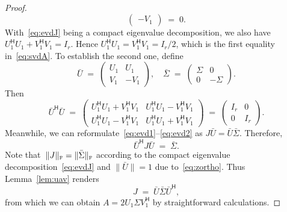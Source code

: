 \documentclass[11pt,a4paper]{article}  %
\numberwithin{equation}{section}
\theoremstyle{definition}
\newcommand{\fro}{{\scriptscriptstyle{\textnormal{F}}}}
\newcommand{\hmt}{{\scriptscriptstyle{{\mathsf{H}}}}}
\begin{document}
\begin{proof}
\begin{equation*}
\begin{pmatrix}
      -V_1
    \end{pmatrix} \;=\;0.
  \end{equation*}
  With~\eqref{eq:evdJ} being a compact eigenvalue decomposition, we also have~$U_1^\hmt U_1 + V_1^\hmt V_1 = I_r$.
  Hence $U_1^\hmt U_1 = V_1^\hmt V_1= {I_r}/{2}$,
  which is the first equality in~\eqref{eq:svdA}. To establish the second one, define
  \begin{equation*}
    \bar{U}\;=\;
    \begin{pmatrix}
      U_1 & U_1 \\
      V_1 & -V_1
    \end{pmatrix},
    \quad
      \bar{\Sigma} \;=\;
    \begin{pmatrix}
        \Sigma & 0\\
        0&-\Sigma
    \end{pmatrix}.
  \end{equation*}
  Then
  \begin{equation}
    \label{eq:zortho}
    \bar{U}^\hmt \bar{U} \;=\;
    \begin{pmatrix}
      U_1^\hmt U_1 + V_1^\hmt V_1 & U_1^\hmt U_1-V_1^\hmt V_1\\
      U_1^\hmt U_1 - V_1^\hmt V_1 & U_1^\hmt U_1+V_1^\hmt V_1
    \end{pmatrix}
    \;=\;
    \begin{pmatrix}
      I_r & 0\\
      0 & I_r
    \end{pmatrix}.
  \end{equation}
  Meanwhile, we can reformulate~\eqref{eq:evd1}--\eqref{eq:evd2} as $J\bar{U}= \bar{U}\bar{\Sigma}$.
  Therefore,
  \[
  \bar{U}^\hmt J \bar{U} \;=\; \bar{\Sigma}.
  \]
  Note that~$\|J\|_\fro = \|\bar{\Sigma}\|_\fro$ according to the compact eigenvalue
  decomposition~\eqref{eq:evdJ}
  and $\|\bar{U}\|=1$ due to~\eqref{eq:zortho}.
  Thus Lemma~\ref{lem:uav} renders
    \begin{equation}
      \label{eq:jdec}
      J \;=\; \bar{U}\bar{\Sigma}\bar{U}^\hmt,
    \end{equation}
  from which we can obtain $A = 2U_1\Sigma V_1^\hmt$ by straightforward calculations.


\end{proof}
\end{document}
